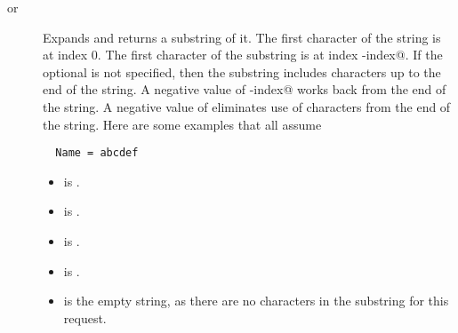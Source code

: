 \begin{description}
\item [
       or ]
Expands \verb@name@ and returns a substring of it.
The first character of the string is at index 0.
The first character of the substring is at index \verb@start-index@.
If the optional \verb@length@ is not specified, 
then the substring includes characters up to the end of the string.
A negative value of  \verb@start-index@ works back from the end of the
string.
A negative value of \verb@length@ eliminates use of characters
from the end of the string.
Here are some examples that all assume
\begin{verbatim}
  Name = abcdef
\end{verbatim}
\begin{itemize}
  \item {} is .
  \item {} is .
  \item {} is .
  \item {} is .
  \item {} is the empty string, as there are
no characters in the substring for this request.
\end{itemize}

\end{description}
